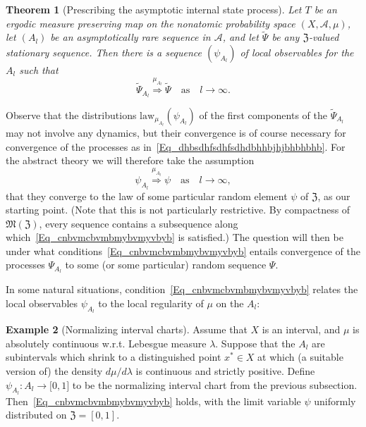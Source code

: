 \documentclass[10pt]{amsart}
\newtheorem{theo}{Theorem}[section]
\theoremstyle{definition}\newtheorem{defi}[theo]{Definition}\newtheorem{rema}[theo]{Remark}\newtheorem{exam}[theo]{Example}\newtheorem{exem}[theo]{Example}\newtheorem{nota}[theo]{Notation}
\newcommand{\clA}{\mathcal{A}}
\newcommand{\law}{\mathrm{law}}
\newcommand{\frkZ}{\mathfrak{Z}}
\newcommand{\frkM}{\mathfrak{M}}
\begin{document}
\begin{theo}[{Prescribing the asymptotic internal state process}]\label{T_PrescribingPSI}
Let $T$ be an ergodic measure preserving map on the nonatomic probability space $(X,\clA,\mu)$, let $(A_{l})$ be an asymptotically rare sequence in $\clA$, and let $\widetilde{\Psi}$ be any $\frkZ$-valued stationary sequence. Then there is a sequence $(\psi_{A_{l}})$ of local observables for the $A_{l}$ such that
\begin{equation}\label{Eq_dhbsdhfsdhfsdhdbhhbjhjbhbhbhb}
\widetilde{\Psi}_{A_{l}}\overset{\mu_{A_{l}}}{\Longrightarrow}\widetilde{\Psi }\quad\text{as}\quad l\rightarrow\infty.
\end{equation}
\end{theo}



Observe that the distributions $\law_{\mu_{A_{l}}}(\psi_{A_{l}})$ of the first components of the $\widetilde{\Psi}_{A_{l}}$ may not involve any dynamics, but their convergence is of course necessary for convergence of the processes as in~\eqref{Eq_dhbsdhfsdhfsdhdbhhbjhjbhbhbhb}. For the abstract theory we will therefore take the assumption
\begin{equation}\label{Eq_cnbvmcbvmbmybvmyvbyb}
\psi_{A_{l}}\overset{\mu_{A_{l}}}{\Longrightarrow}\psi\quad\text{as}\quad l\rightarrow\infty, 
\end{equation}
that they converge to the law of some particular random element $\psi$ of $\frkZ$, as our starting point. (Note that this is not particularly restrictive. By compactness of $\frkM(\frkZ)$, every sequence contains a subsequence along which~\eqref{Eq_cnbvmcbvmbmybvmyvbyb} is satisfied.) The question will then be under what conditions~\eqref{Eq_cnbvmcbvmbmybvmyvbyb} entails convergence of the processes $\Psi_{A_{l}}$ to some (or some particular) random sequence $\Psi$.

In some natural situations, condition~\eqref{Eq_cnbvmcbvmbmybvmyvbyb} relates the local observables $\psi_{A_{l}}$ to the local regularity of $\mu$ on the $A_{l}$:

\begin{exam}[{Normalizing interval charts}]
Assume that $X$ is an interval, and $\mu$ is absolutely continuous w.r.t. Lebesgue measure $\lambda$. Suppose that the $A_{l}$ are subintervals which shrink to a distinguished point $x^{\ast }\in X$ at which (a suitable version of) the density $d\mu/d\lambda$ is continuous and strictly positive. Define $\psi_{A_{l}}:A_{l}\rightarrow
\lbrack0,1]$ to be the normalizing interval chart from the previous subsection. Then~\eqref{Eq_cnbvmcbvmbmybvmyvbyb} holds, with the limit variable $\psi$ uniformly distributed on $\frkZ=[0,1]$.
\end{exam}
\end{document}
